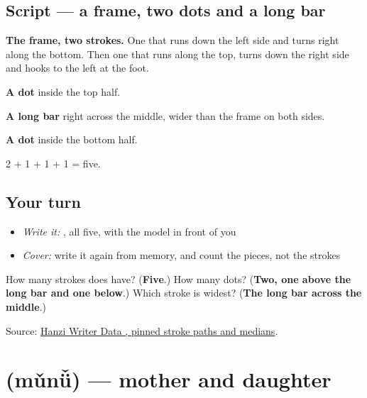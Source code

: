 \subsection*{Script — a frame, two dots and a long bar}

\begin{quote}
\end{quote}

\textbf{The frame, two strokes.} One that runs down the left side and turns right along the bottom. Then one that runs along the top, turns down the right side and hooks to the left at the foot.

\textbf{A dot} inside the top half.

\textbf{A long bar} right across the middle, wider than the frame on both sides.

\textbf{A dot} inside the bottom half.

2 + 1 + 1 + 1 = five.

\subsection*{Your turn}
\begin{itemize}
\raggedright
  \item \emph{Write it:} , all five, with the model in front of you
  \item \emph{Cover:} write it again from memory, and count the pieces, not the strokes
\end{itemize}

\begin{tcolorbox}[breakable,colback=teal!4,colframe=teal!35!black,title={Before you move on}]
How many strokes does  have? (\textbf{Five}.) How many dots? (\textbf{Two, one above the long bar and one below}.) Which stroke is widest? (\textbf{The long bar across the middle}.)

Source: \href{https://raw.githubusercontent.com/chanind/hanzi-writer-data/68d10a4b21150cae5e1ebbd223eed289cf32d90c/data/\%E6\%AF\%8D.json}{Hanzi Writer Data , pinned stroke paths and medians}.
\end{tcolorbox}
\section[\texorpdfstring{\zh{母女} (mǔnǚ)}{母女 (mǔnǚ)}]{ (mǔnǚ) — mother and daughter}

